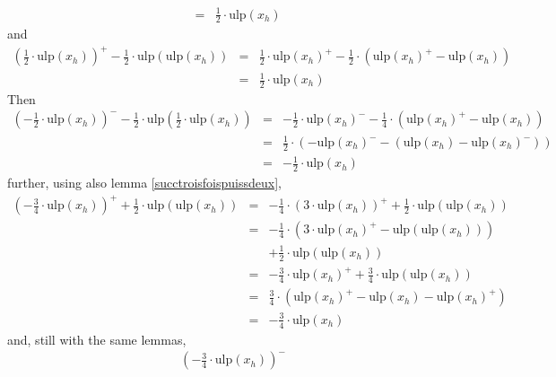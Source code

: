 \documentclass[a4paper,10pt,twoside]{article}
\newenvironment{proof}[1][Proof]{\begin{trivlist}
\item[\hskip \labelsep {\bfseries #1}]}{\end{trivlist}}
\newcommand{\hi}{\ensuremath{\mathit{h}}}
\newcommand{\mUlp}{\ensuremath{\mathrm{ulp}}}
\begin{document}
\begin{proof}
\begin{eqnarray*}
& = & \frac{1}{2} \cdot  \mUlp\left( x_\hi \right) 
\end{eqnarray*}
and
\begin{eqnarray*}
\left( \frac{1}{2} \cdot  \mUlp\left( x_\hi \right)  \right)^+ - \frac{1}{2} \cdot \mUlp\left(  \mUlp\left( x_\hi \right)  \right) & = & 
\frac{1}{2} \cdot  \mUlp\left( x_\hi \right)^+ - \frac{1}{2} \cdot \left(  \mUlp\left( x_\hi \right)^+ -  \mUlp\left( x_\hi \right)  \right) \\
& = & \frac{1}{2} \cdot  \mUlp\left( x_\hi \right) 
\end{eqnarray*}
Then
\begin{eqnarray*}
\left( - \frac{1}{2} \cdot  \mUlp\left( x_\hi \right)  \right)^- - \frac{1}{2} \cdot \mUlp\left( \frac{1}{2} \cdot  \mUlp\left( x_\hi \right)  \right) 
& = & - \frac{1}{2} \cdot  \mUlp\left( x_\hi \right)^- - \frac{1}{4} \cdot \left(  \mUlp\left( x_\hi \right)^+ -  \mUlp\left( x_\hi \right)  \right) \\
& = & \frac{1}{2} \cdot \left( - \mUlp\left( x_\hi \right)^- - \left(  \mUlp\left( x_\hi \right)  -  \mUlp\left( x_\hi \right)^- \right) \right) \\
& = & - \frac{1}{2} \cdot  \mUlp\left( x_\hi \right) 
\end{eqnarray*}
further, using also lemma \ref{succtroisfoispuissdeux},
\begin{eqnarray*}
\left( - \frac{3}{4} \cdot \mUlp\left( x_\hi \right) \right)^+
+ \frac{1}{2} \cdot \mUlp\left( \mUlp\left( x_\hi \right) \right) 
& = & - \frac{1}{4} \cdot \left( 3 \cdot \mUlp\left( x_\hi \right) \right)^+ + 
\frac{1}{2} \cdot \mUlp\left( \mUlp\left( x_\hi \right) \right) \\
& = & - \frac{1}{4} \cdot \left( 3 \cdot \mUlp\left( x_\hi \right)^+ - \mUlp\left( \mUlp\left( x_\hi \right)\right)\right)
\\ & & + \frac{1}{2} \cdot \mUlp\left( \mUlp\left( x_\hi \right) \right) \\
& = & - \frac{3}{4} \cdot \mUlp\left( x_\hi \right)^+ + 
\frac{3}{4} \cdot \mUlp\left( \mUlp\left( x_\hi \right) \right) \\
& = & \frac{3}{4}\cdot\left( \mUlp\left( x_\hi \right)^+ -\mUlp\left( x_\hi\right) -\mUlp\left( x_\hi \right)^+ \right) \\
& = & -\frac{3}{4} \cdot \mUlp\left( x_\hi \right)
\end{eqnarray*}
and, still with the same lemmas,
\begin{eqnarray*}
\left( - \frac{3}{4} \cdot \mUlp\left( x_\hi \right) \right)^- 

\end{eqnarray*}
\end{proof}
\end{document}

